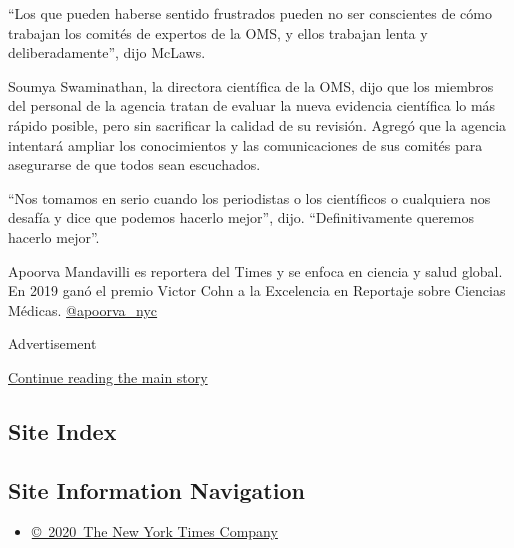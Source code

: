``Los que pueden haberse sentido frustrados pueden no ser conscientes de
cómo trabajan los comités de expertos de la OMS, y ellos trabajan lenta
y deliberadamente'', dijo McLaws.

Soumya Swaminathan, la directora científica de la OMS, dijo que los
miembros del personal de la agencia tratan de evaluar la nueva evidencia
científica lo más rápido posible, pero sin sacrificar la calidad de su
revisión. Agregó que la agencia intentará ampliar los conocimientos y
las comunicaciones de sus comités para asegurarse de que todos sean
escuchados.

``Nos tomamos en serio cuando los periodistas o los científicos o
cualquiera nos desafía y dice que podemos hacerlo mejor'', dijo.
``Definitivamente queremos hacerlo mejor''.

Apoorva Mandavilli es reportera del Times y se enfoca en ciencia y salud
global. En 2019 ganó el premio Victor Cohn a la Excelencia en Reportaje
sobre Ciencias Médicas.
\href{https://twitter.com/apoorva_nyc}{@apoorva\_nyc}

Advertisement

\protect\hyperlink{after-bottom}{Continue reading the main story}

\hypertarget{site-index}{%
\subsection{Site Index}\label{site-index}}

\hypertarget{site-information-navigation}{%
\subsection{Site Information
Navigation}\label{site-information-navigation}}

\begin{itemize}
\tightlist
\item
  \href{https://help.nytimes.com/hc/en-us/articles/115014792127-Copyright-notice}{©~2020~The
  New York Times Company}
\end{itemize}

